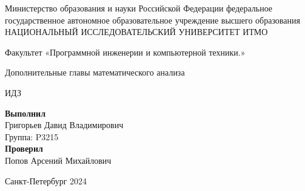 
\begin{center}
	Министерство образования и науки Российской Федерации
	федеральное государственное автономное образовательное учреждение высшего образования
	\\
     {НАЦИОНАЛЬНЫЙ ИССЛЕДОВАТЕЛЬСКИЙ УНИВЕРСИТЕТ ИТМО}
    
    \vspace{2em}
    Факультет «Программной инженерии и компьютерной техники.»

    \vspace{10em}
    
    {\large Дополнительные главы математического анализа}\\
    
    \vspace{2em}
    
    {\large ИДЗ }
    \\
\end{center}
   

\vspace{20em}

\begin{flushright}
    \textbf{Выполнил} \\
    Григорьев Давид Владимирович\\
    Группа: P3215\\
    \textbf{Проверил}\\
    Попов Арсений Михайлович
    
\end{flushright}

\vspace{\fill}

\begin{center}
   Санкт-Петербург 2024
\end{center}
